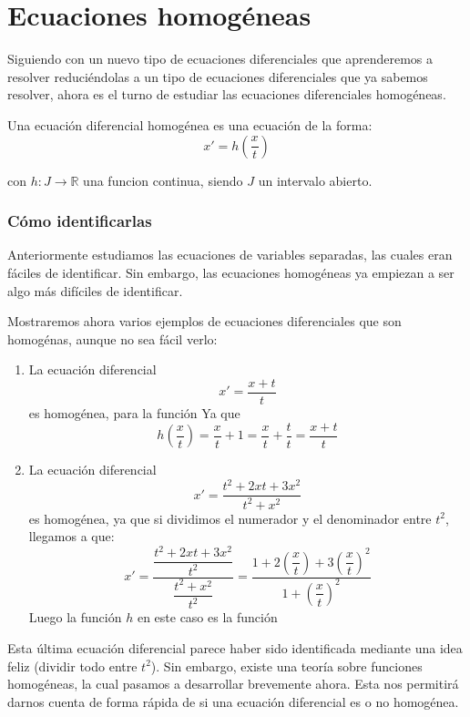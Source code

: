 \section{Ecuaciones homogéneas}
Siguiendo con un nuevo tipo de ecuaciones diferenciales que aprenderemos a resolver reduciéndolas a un tipo de ecuaciones diferenciales que ya sabemos resolver, ahora es el turno de estudiar las ecuaciones diferenciales homogéneas.

Una ecuación diferencial homogénea es una ecuación de la forma:
\begin{equation*}
    x' = h\left(\dfrac{x}{t}\right)
\end{equation*}

con $h:J\rightarrow\mathbb{R}$ una funcion continua, siendo $J$ un intervalo abierto.\\

\subsubsection{Cómo identificarlas}
Anteriormente estudiamos las ecuaciones de variables separadas, las cuales eran fáciles de identificar. Sin embargo, las ecuaciones homogéneas ya empiezan a ser algo más difíciles de identificar. 

Mostraremos ahora varios ejemplos de ecuaciones diferenciales que son homogénas, aunque no sea fácil verlo:

\begin{enumerate}
    \item La ecuación diferencial
        \begin{equation*}
            x' = \dfrac{x+t}{t}
        \end{equation*}
        es homogénea, para la función
        Ya que
        \begin{equation*}
            h\left(\dfrac{x}{t}\right) = \dfrac{x}{t} + 1 = \dfrac{x}{t} + \dfrac{t}{t} = \dfrac{x+t}{t}
        \end{equation*}
    \item La ecuación diferencial
        \begin{equation*}
            x' = \dfrac{t^2 + 2xt + 3x^2}{t^2 + x^2}
        \end{equation*}
        es homogénea, ya que si dividimos el numerador y el denominador entre $t^2$, llegamos a que:
        \begin{equation*}
            x' = \dfrac{\dfrac{t^2 + 2xt + 3x^2}{t^2}}{\dfrac{t^2 + x^2}{t^2}} = \dfrac{1+2\left(\dfrac{x}{t}\right) + 3{\left(\dfrac{x}{t}\right)}^{2}}{1 + {\left(\dfrac{x}{t}\right)}^{2}}
        \end{equation*}
        Luego la función $h$ en este caso es la función
\end{enumerate}
Esta última ecuación diferencial parece haber sido identificada mediante una idea feliz (dividir todo entre $t^2$). Sin embargo, existe una teoría sobre funciones homogéneas, la cual pasamos a desarrollar brevemente ahora. Esta nos permitirá darnos cuenta de forma rápida de si una ecuación diferencial es o no homogénea.

